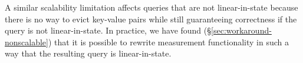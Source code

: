 A similar scalability limitation affects queries that are not linear-in-state
because there is no way to evict key-value pairs while still guaranteeing
correctness if the query is not linear-in-state. In practice, we have found
(\S\ref{sec:workaround-nonscalable}) that it is possible to rewrite measurement
functionality in such a way that the resulting query is linear-in-state.
